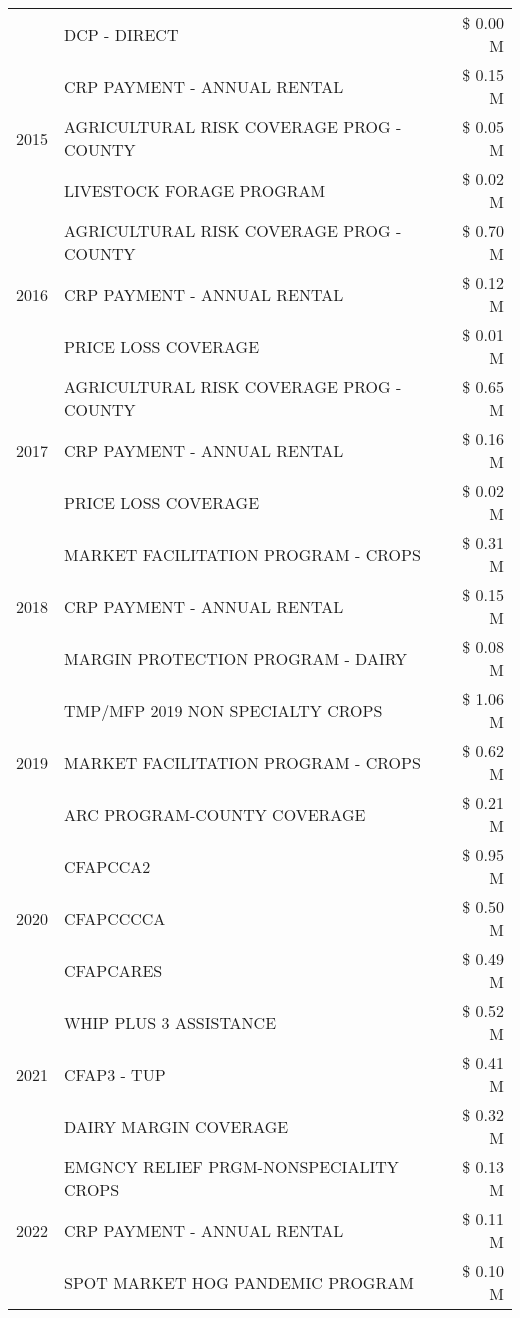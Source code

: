 \begin{tabular}{llr}
 & DCP - DIRECT & \$ 0.00 M \\
\cline{1-3}
\multirow[t]{3}{*}{2015} & CRP PAYMENT - ANNUAL RENTAL & \$ 0.15 M \\
 & AGRICULTURAL RISK COVERAGE PROG - COUNTY & \$ 0.05 M \\
 & LIVESTOCK FORAGE PROGRAM & \$ 0.02 M \\
\cline{1-3}
\multirow[t]{3}{*}{2016} & AGRICULTURAL RISK COVERAGE PROG - COUNTY & \$ 0.70 M \\
 & CRP PAYMENT - ANNUAL RENTAL & \$ 0.12 M \\
 & PRICE LOSS COVERAGE & \$ 0.01 M \\
\cline{1-3}
\multirow[t]{3}{*}{2017} & AGRICULTURAL RISK COVERAGE PROG - COUNTY & \$ 0.65 M \\
 & CRP PAYMENT - ANNUAL RENTAL & \$ 0.16 M \\
 & PRICE LOSS COVERAGE & \$ 0.02 M \\
\cline{1-3}
\multirow[t]{3}{*}{2018} & MARKET FACILITATION PROGRAM - CROPS & \$ 0.31 M \\
 & CRP PAYMENT - ANNUAL RENTAL & \$ 0.15 M \\
 & MARGIN PROTECTION PROGRAM - DAIRY & \$ 0.08 M \\
\cline{1-3}
\multirow[t]{3}{*}{2019} & TMP/MFP 2019 NON SPECIALTY CROPS & \$ 1.06 M \\
 & MARKET FACILITATION PROGRAM - CROPS & \$ 0.62 M \\
 & ARC PROGRAM-COUNTY COVERAGE & \$ 0.21 M \\
\cline{1-3}
\multirow[t]{3}{*}{2020} & CFAPCCA2 & \$ 0.95 M \\
 & CFAPCCCCA & \$ 0.50 M \\
 & CFAPCARES & \$ 0.49 M \\
\cline{1-3}
\multirow[t]{3}{*}{2021} & WHIP PLUS 3 ASSISTANCE & \$ 0.52 M \\
 & CFAP3 - TUP & \$ 0.41 M \\
 & DAIRY MARGIN COVERAGE & \$ 0.32 M \\
\cline{1-3}
\multirow[t]{3}{*}{2022} & EMGNCY RELIEF PRGM-NONSPECIALITY CROPS & \$ 0.13 M \\
 & CRP PAYMENT - ANNUAL RENTAL & \$ 0.11 M \\
 & SPOT MARKET HOG PANDEMIC PROGRAM & \$ 0.10 M \\
\cline{1-3}
\bottomrule
\end{tabular}
